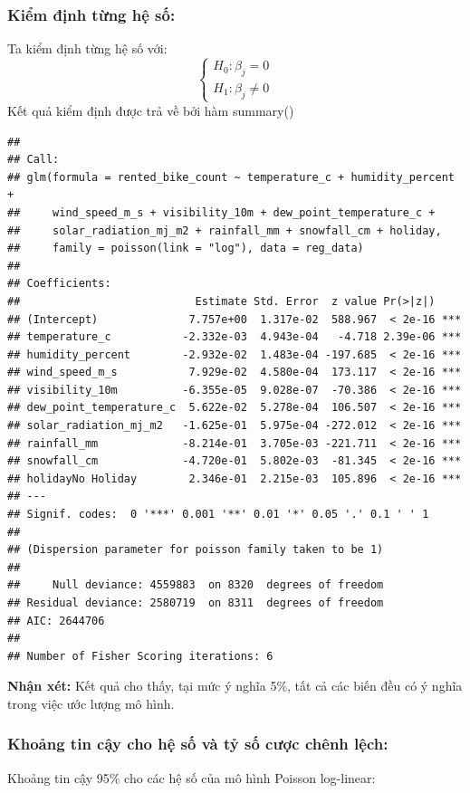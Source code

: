 \documentclass[
  11pt,
  letterpaper,
]{article}
\begin{document}
\subsubsection{Kiểm định từng hệ số:}
Ta kiểm định từng hệ số với: 
$$\begin{cases}
H_0:    \beta_j = 0 \\
H_1:    \beta_j \neq 0
\end{cases}$$
Kết quả kiểm định được trả về bởi hàm summary()

\begin{verbatim}
## 
## Call:
## glm(formula = rented_bike_count ~ temperature_c + humidity_percent + 
##     wind_speed_m_s + visibility_10m + dew_point_temperature_c + 
##     solar_radiation_mj_m2 + rainfall_mm + snowfall_cm + holiday, 
##     family = poisson(link = "log"), data = reg_data)
## 
## Coefficients:
##                           Estimate Std. Error  z value Pr(>|z|)    
## (Intercept)              7.757e+00  1.317e-02  588.967  < 2e-16 ***
## temperature_c           -2.332e-03  4.943e-04   -4.718 2.39e-06 ***
## humidity_percent        -2.932e-02  1.483e-04 -197.685  < 2e-16 ***
## wind_speed_m_s           7.929e-02  4.580e-04  173.117  < 2e-16 ***
## visibility_10m          -6.355e-05  9.028e-07  -70.386  < 2e-16 ***
## dew_point_temperature_c  5.622e-02  5.278e-04  106.507  < 2e-16 ***
## solar_radiation_mj_m2   -1.625e-01  5.975e-04 -272.012  < 2e-16 ***
## rainfall_mm             -8.214e-01  3.705e-03 -221.711  < 2e-16 ***
## snowfall_cm             -4.720e-01  5.802e-03  -81.345  < 2e-16 ***
## holidayNo Holiday        2.346e-01  2.215e-03  105.896  < 2e-16 ***
## ---
## Signif. codes:  0 '***' 0.001 '**' 0.01 '*' 0.05 '.' 0.1 ' ' 1
## 
## (Dispersion parameter for poisson family taken to be 1)
## 
##     Null deviance: 4559883  on 8320  degrees of freedom
## Residual deviance: 2580719  on 8311  degrees of freedom
## AIC: 2644706
## 
## Number of Fisher Scoring iterations: 6
\end{verbatim}

\textbf{Nhận xét:} Kết quả cho thấy, tại mức ý nghĩa 5\%, tất cả các biến đều có ý nghĩa trong việc ước lượng mô hình.

\subsubsection{Khoảng tin cậy cho hệ số và tỷ số cược chênh lệch:}

Khoảng tin cậy 95\% cho các hệ số của mô hình Poisson log-linear:
\end{document}

